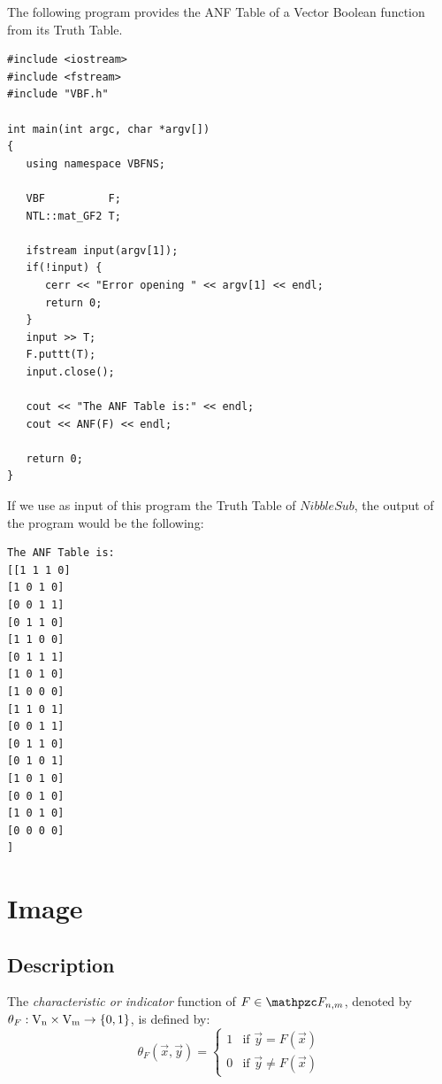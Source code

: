 \begin{example}
The following program provides the ANF Table of a Vector Boolean function from its Truth Table.

\begin{verbatim}
#include <iostream>
#include <fstream>
#include "VBF.h"

int main(int argc, char *argv[])
{
   using namespace VBFNS;

   VBF          F;
   NTL::mat_GF2 T;

   ifstream input(argv[1]);
   if(!input) {
      cerr << "Error opening " << argv[1] << endl;
      return 0;
   }
   input >> T;
   F.puttt(T);
   input.close();

   cout << "The ANF Table is:" << endl;
   cout << ANF(F) << endl; 

   return 0;
}
\end{verbatim}

If we use as input of this program the Truth Table of $NibbleSub$, the output of the program would be the following:

\begin{verbatim}
The ANF Table is:
[[1 1 1 0]
[1 0 1 0]
[0 0 1 1]
[0 1 1 0]
[1 1 0 0]
[0 1 1 1]
[1 0 1 0]
[1 0 0 0]
[1 1 0 1]
[0 0 1 1]
[0 1 1 0]
[0 1 0 1]
[1 0 1 0]
[0 0 1 0]
[1 0 1 0]
[0 0 0 0]
]
\end{verbatim}

\end{example}

\section{Image}
\label{sec:Image}

\subsection{Description}

\begin{definition}
The \textit{characteristic or indicator} function of $F \in \funct{F}_{n,m}$, denoted by $\theta_F : \gf{V_n} \times \gf{V_m} \to \left\{0,1\right\}$, is defined by:
\begin{equation}
    \theta_F(\vec{x},\vec{y}) = \left\{
  \begin{array}{cc}
    1 & \mbox{if }\vec{y}=F(\vec{x}) \\
    0 & \mbox{if }\vec{y} \neq F(\vec{x})
  \end{array}
\right. 
\end{equation}
\end{definition}

